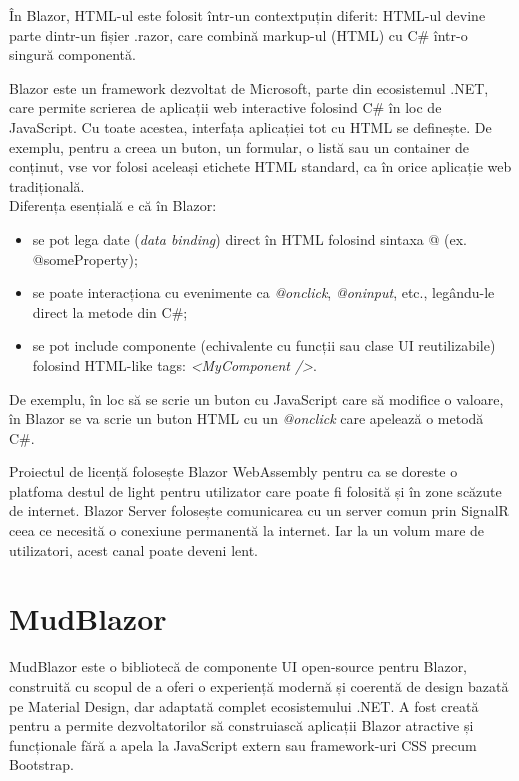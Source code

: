 În Blazor, HTML-ul este folosit într-un contextpuțin diferit: HTML-ul devine parte dintr-un fișier .razor,
care combină markup-ul (HTML) cu C\# într-o singură componentă.

Blazor este un framework dezvoltat de Microsoft, parte din ecosistemul .NET, care permite scrierea de
aplicații web interactive folosind C\# în loc de JavaScript. Cu toate acestea, interfața aplicației tot
cu HTML se definește. De exemplu, pentru a creea un buton, un formular, o listă sau un container de
conținut, vse vor folosi aceleași etichete HTML standard, ca în orice aplicație web tradițională. \parencite{blazor}
\\Diferența esențială e că în Blazor:
\begin{itemize}
    \item  se pot lega date (\textit{data binding}) direct în HTML folosind sintaxa @ (ex. @someProperty);
    \item  se poate interacționa cu evenimente ca \textit{@onclick}, \textit{@oninput}, etc., legându-le direct la metode din C\#;
    \item  se pot include componente (echivalente cu funcții sau clase UI reutilizabile) folosind HTML-like tags:
          \textit{<MyComponent />}.
\end{itemize}
\parencite{blazor}

De exemplu, în loc să se scrie un buton cu JavaScript care să modifice o valoare, în Blazor se va scrie un
buton HTML cu un \textit{@onclick} care apelează o metodă C\#.

Proiectul de licență folosește Blazor WebAssembly pentru ca se doreste o platfoma destul de light pentru utilizator care poate fi folosită și în zone scăzute de internet.
Blazor Server folosește comunicarea cu un server comun prin SignalR ceea ce necesită o conexiune permanentă la internet. Iar la un volum mare de utilizatori, acest canal poate deveni lent.

\section{MudBlazor}

MudBlazor este o bibliotecă de componente UI open-source pentru Blazor, construită cu scopul de a oferi o
experiență modernă și coerentă de design bazată pe Material Design, dar adaptată complet ecosistemului .NET.
A fost creată pentru a permite dezvoltatorilor să construiască aplicații Blazor atractive și funcționale fără
a apela la JavaScript extern sau framework-uri CSS precum Bootstrap. \parencite{mudblazor}

